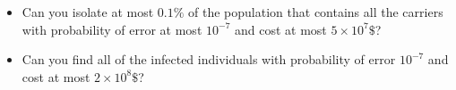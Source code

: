 \documentclass[11pt]{article} \usepackage{amssymb}
\begin{document}
\begin{itemize}
\item
Can you isolate at most $0.1\%$ of the population that contains all the carriers with probability of error at most $10^{-7}$ 
and cost at most $5 \times 10^{7}\$$?
\item
Can you find all of the infected individuals with probability of error 
$10^{-7}$
and cost at most $2 \times 10^{8}\$$?
\end{itemize}
\end{document}
